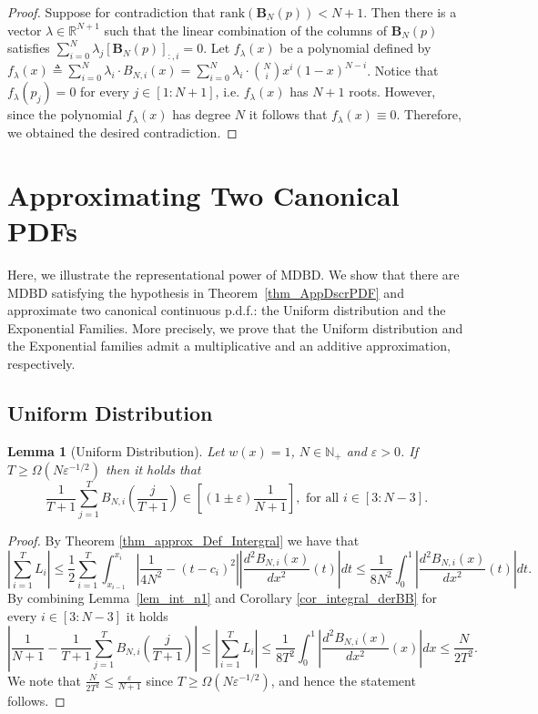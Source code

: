 \documentclass[11pt]{article}
\newcommand{\MDBD}{\mathrm{MDBD}}
\newcommand{\mB}{\mathbf{B}}
\newcommand{\N}{\mathbb{N}}
\newcommand{\eps}{\epsilon}
\renewcommand{\leq}{\leqslant}
\renewcommand{\geq}{\geqslant}
\renewcommand{\eps}{\varepsilon}
\newtheorem{lem}[thm]{Lemma}
\numberwithin{thm}{section}
\begin{document}
\begin{proof}
Suppose for contradiction that $\mathrm{rank}(\mB_{N}(p))<N+1$.
Then there is a vector $\lambda\in\mathbb{R}^{N+1}$ such that the
linear combination of the columns of $\mB_{N}(p)$
satisfies $\sum_{i=0}^{N}\lambda_{j}[\mB_{N}(p)]_{:,i}=0$.
Let $f_{\lambda}(x)$ be a polynomial defined by $f_{\lambda}(x)\triangleq\sum_{i=0}^{N}\lambda_{i}\cdot B_{N,i}(x)=\sum_{i=0}^{N}\lambda_{i}\cdot{N \choose i}x^{i}(1-x)^{N-i}$.
Notice that $f_{\lambda}(p_{j})=0$ for every $j\in[1:N+1]$,
i.e. $f_{\lambda}(x)$ has $N+1$ roots. However, since
the polynomial $f_{\lambda}(x)$ has degree $N$ it follows
that $f_{\lambda}(x)\equiv0$. Therefore, we obtained the desired
contradiction.
\end{proof}



\section{Approximating Two Canonical PDFs}\label{appsec:AGPD}

Here, we illustrate the representational power of $\MDBD$. We show that there are $\MDBD$ satisfying the hypothesis in Theorem~\ref{thm_AppDscrPDF} and approximate two canonical continuous p.d.f.: the Uniform distribution and the Exponential Families. More precisely, we prove that the Uniform distribution and the Exponential families admit a multiplicative and an additive approximation, respectively.

\subsection{Uniform Distribution}

\begin{lem}[Uniform Distribution]\label{lem_Approx_Bni}
Let $w(x)=1$, $N\in\N_{+}$ and $\eps>0$. If $T\geq\Omega(N\eps^{-1/2})$ then it holds that
\[
\frac{1}{T+1}\sum_{j=1}^{T}B_{N,i}\left(\frac{j}{T+1}\right)\in\left[(1\pm\eps)\frac{1}{N+1}\right], \text{ for all}\,\,i\in[3:N-3].
\]
\end{lem}

\begin{proof}
By Theorem \ref{thm_approx_Def_Intergral} we have that
\[
\left|\sum_{i=1}^{T}L_{i}\right|\leq\frac{1}{2}\sum_{i=1}^{T}\int_{x_{i-1}}^{x_{i}}\left|\frac{1}{4N^{2}}-(t-c_{i})^{2}\right|\left|\frac{d^{2}B_{N,i}(x)}{dx^{2}}(t)\right|dt\leq\frac{1}{8N^{2}}\int_{0}^{1}\left|\frac{d^{2}B_{N,i}(x)}{dx^{2}}(t)\right|dt.
\]
By combining Lemma~\ref{lem_int_n1} and Corollary \ref{cor_integral_derBB} for every $i\in[3:N-3]$
it holds
\[
\left|\frac{1}{N+1}-\frac{1}{T+1}\sum_{j=1}^{T}B_{N,i}\left(\frac{j}{T+1}\right)\right|\leq\left|\sum_{i=1}^{T}L_{i}\right|\leq\frac{1}{8T^{2}}\int_{0}^{1}\left|\frac{d^{2}B_{N,i}(x)}{dx^{2}}(x)\right|dx\leq\frac{N}{2T^{2}}.
\]
We note that $\frac{N}{2T^{2}}\leq\frac{\eps}{N+1}$ since $T\geq\Omega(N\eps^{-1/2})$, and hence the statement follows.
\end{proof}
\end{document}

